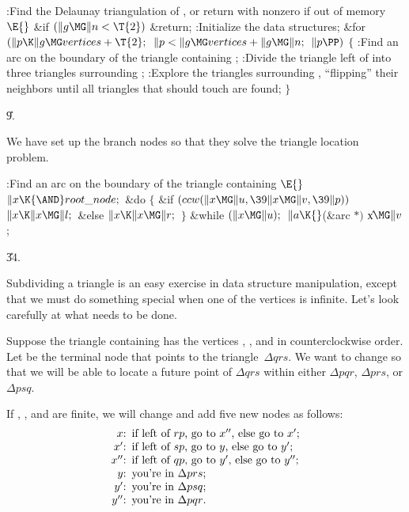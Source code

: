 \Y\B\4:Find the Delaunay triangulation of , or return with  nonzero if out of memory\X${}\E{}$\6
\&{if} ${}(\|g\MG\|n<\T{2}){}$\1\5
\&{return};\2\6
:Initialize the data structures\X;\6
\&{for} ${}(\|p\K\|g\MG\\{vertices}+\T{2};{}$ ${}\|p<\|g\MG\\{vertices}+\|g\MG%
\|n;{}$ ${}\|p\PP){}$\5
${}\{{}$\1\6
:Find an arc  on the boundary of the triangle containing %
\X;\6
:Divide the triangle left of  into three triangles surrounding \X;\6
:Explore the triangles surrounding , ``flipping'' their neighbors
until all triangles that should touch  are found\X;\6
\4${}\}{}$\2\par
\U9.\fi

We have set up the branch nodes so that they solve the triangle location
problem.

\Y\B\4:Find an arc  on the boundary of the triangle containing \X${}\E{}$\6
$\|x\K{\AND}\\{root\_node};{}$\6
\&{do}\5
${}\{{}$\1\6
\&{if} ${}(\\{ccw}(\|x\MG\|u,\39\|x\MG\|v,\39\|p)){}$\1\5
${}\|x\K\|x\MG\|l;{}$\2\6
\&{else}\1\5
${}\|x\K\|x\MG\|r;{}$\2\6
\4${}\}{}$\5
\2\5
\&{while} ${}(\|x\MG\|u);{}$\6
${}\|a\K{}$(\&{arc} ${}{*}){}$ \|x${}\MG\|v{}$;\par
\U34.\fi

Subdividing a triangle is an easy exercise in data structure
manipulation,
except that we must do something special when one of the vertices is
infinite. Let's look carefully at what needs to be done.

Suppose the triangle containing  has the vertices , ,
and 
in counterclockwise order. Let  be the terminal node that points to
the triangle~$\Delta qrs$. We want to change  so that we will be
able to locate a future point of $\Delta qrs$ within either $\Delta pqr$,
$\Delta prs$, or $\Delta psq$.

If , , and  are finite, we will change  and add
five new nodes
as follows:
$$\vbox{\halign{\hfil#:\enspace&#\hfil\cr
$x$&if left of $rp$, go to $x''$, else go to $x'$;\cr
$x'$&if left of $sp$, go to $y$, else go to $y'$;\cr
$x''$&if left of $qp$, go to $y'$, else go to $y''$;\cr
$y$&you're in $\Delta prs$;\cr
$y'$&you're in $\Delta psq$;\cr
$y''$&you're in $\Delta pqr$.\cr}}$$

